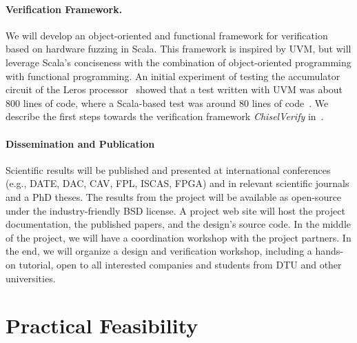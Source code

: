 \documentclass[fleqn,12pt]{article}
\begin{document}
\paragraph{Verification Framework.}

We will develop an object-oriented and functional framework for verification based on hardware fuzzing in Scala.
This framework is inspired by UVM, but will leverage Scala's conciseness with the
combination of object-oriented programming with functional programming.
An initial experiment of testing the accumulator circuit of the Leros processor~\cite{leros:arcs2019}
showed that a test written with UVM was about 800 lines of code, where a Scala-based
test was around 80 lines of code~\cite{verify:chisel:2020}.
We describe the first steps towards the verification framework \emph{ChiselVerify} in~\cite{ChiselVerify:2021}.


\paragraph*{Dissemination and Publication}

Scientific results will be published and presented at international
conferences (e.g., DATE, DAC, CAV, FPL, ISCAS, FPGA) and in relevant scientific journals
and a PhD theses.
The results from the project will be available as open-source under the
industry-friendly BSD license.
A project web site will host the project documentation, the published papers, and the design's source code.
In the middle of the project, we will have a coordination workshop with the project partners.
In the end, we will organize a design and verification workshop, including a hands-on tutorial,
open to all interested companies and students from DTU and other universities.

\section{Practical Feasibility}

\end{document}
